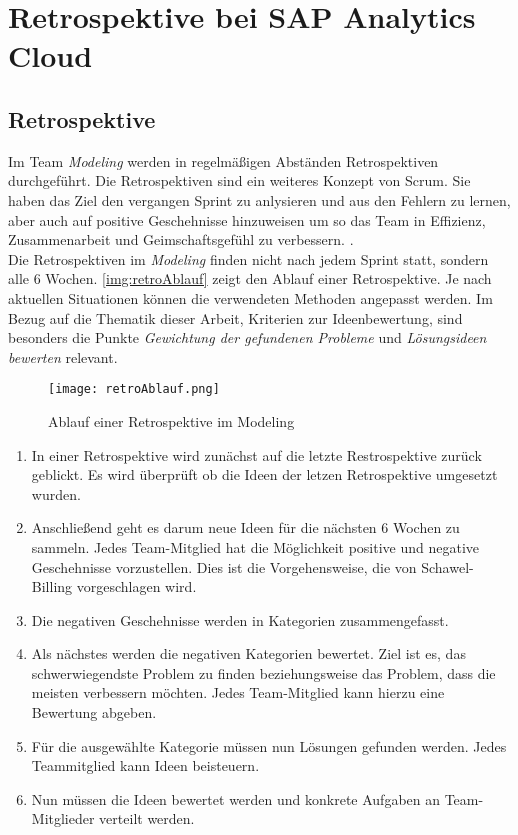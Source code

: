 \section{Retrospektive bei SAP Analytics Cloud}\label{sec:retro}
\subsection{Retrospektive}
Im Team \textit{Modeling} werden in regelmäßigen Abständen Retrospektiven durchgeführt. 
Die Retrospektiven sind ein weiteres Konzept von Scrum. Sie haben das Ziel den vergangen Sprint zu anlysieren und aus den Fehlern zu lernen, aber auch  auf positive 
Geschehnisse hinzuweisen um so das Team in Effizienz, Zusammenarbeit und Geimschaftsgefühl zu verbessern. \cite{retro:2018}. \\
Die Retrospektiven im \textit{Modeling} finden nicht nach jedem Sprint statt, sondern alle 6 Wochen.
\autoref{img:retroAblauf} zeigt den Ablauf einer Retrospektive. Je nach aktuellen Situationen können die 
verwendeten Methoden angepasst werden. Im Bezug auf die Thematik dieser Arbeit, Kriterien zur Ideenbewertung,  
sind besonders die Punkte \textit{Gewichtung der gefundenen Probleme} und \textit{Lösungsideen bewerten} relevant.
\begin{figure}[ht]
	\centering
	\texttt{[image: retroAblauf.png]}
    \caption{Ablauf einer Retrospektive im Modeling}
	\label{img:retroAblauf}
\end{figure}
\begin{enumerate}
    \item In einer Retrospektive wird zunächst auf die letzte Restrospektive zurück geblickt. Es wird überprüft ob die Ideen der letzen 
        Retrospektive umgesetzt wurden.
    \item Anschließend geht es darum neue Ideen für die nächsten 6 Wochen zu sammeln. Jedes Team-Mitglied
        hat die Möglichkeit positive und negative Geschehnisse vorzustellen. Dies ist die Vorgehensweise, die von Schawel-Billing vorgeschlagen wird.
    \item Die negativen Geschehnisse werden in Kategorien zusammengefasst. 
    \item Als nächstes werden die negativen Kategorien bewertet. Ziel ist es, das schwerwiegendste Problem zu finden beziehungsweise 
    das Problem, dass die meisten verbessern möchten. Jedes Team-Mitglied kann hierzu eine Bewertung abgeben. 
    \item Für die ausgewählte Kategorie müssen nun Lösungen gefunden werden. Jedes Teammitglied kann Ideen beisteuern. 
    \item Nun müssen die Ideen bewertet werden und konkrete Aufgaben an Team-Mitglieder verteilt werden.
\end{enumerate}

